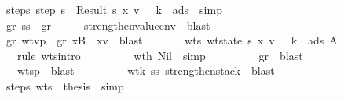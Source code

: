 \begin{isabellebody}
\ \ \ \ \ \ \isamarkupfalse \ steps{\isacharcolon}\ {\isachardoublequoteopen}step\ s\ {\isacharequal}\ Result\ {\isacharparenleft}s{\isacharprime}{\isacharcomma}\ {\isacharparenleft}x{\isacharcomma}\ v{\isacharprime}{\isacharparenright}\ {\isacharhash}\ {\isasymrho}{\isacharcomma}\ k{\isacharcomma}\ {\isasymmu}{\isacharprime}{\isacharcomma}\ ads{}{\isacharparenright}{\isachardoublequoteclose}\ \isamarkupfalse \ simp\isanewline
\ \ \ \ \ \ \isamarkupfalse \ gr\ ss\ \isamarkupfalse \ gr{}{\isacharcolon}\ {\isachardoublequoteopen}{\isasymGamma}{\isacharsemicolon}\ {\isasymSigma}{\isacharprime}\ {\isasymturnstile}\ {\isasymrho}{\isachardoublequoteclose}\ \isamarkupfalse \ strengthen{\isacharunderscore}value{\isacharunderscore}env\ \isamarkupfalse \ blast\isanewline
\ \ \ \ \ \ \isamarkupfalse \ gr{}\ wtvp\ \isamarkupfalse \ gr{}{\isacharcolon}\ {\isachardoublequoteopen}{\isacharparenleft}x{\isacharcomma}B{\isacharparenright}{\isacharhash}{\isasymGamma}{\isacharsemicolon}{\isasymSigma}{\isacharprime}\ {\isasymturnstile}\ {\isacharparenleft}x{\isacharcomma}v{\isacharprime}{\isacharparenright}{\isacharhash}{\isasymrho}{\isachardoublequoteclose}\ \isamarkupfalse \ blast\isanewline
\ \ \ \ \ \ \isamarkupfalse \ wt{\isacharunderscore}s{\isacharcolon}\ {\isachardoublequoteopen}wt{\isacharunderscore}state\ {\isacharparenleft}s{\isacharprime}{\isacharcomma}\ {\isacharparenleft}x{\isacharcomma}\ v{\isacharprime}{\isacharparenright}\ {\isacharhash}\ {\isasymrho}{\isacharcomma}\ k{\isacharcomma}\ {\isasymmu}{\isacharprime}{\isacharcomma}\ ads{}{\isacharparenright}\ A{\isachardoublequoteclose}\ \isanewline
\ \ \ \ \ \ \ \ \isamarkupfalse \ {\isacharparenleft}rule\ wts{\isacharunderscore}intro{\isacharparenright}\isanewline
\ \ \ \ \ \ \ \ \isamarkupfalse \ wth{}\ Nil\ \isamarkupfalse \ simp\isanewline
\ \ \ \ \ \ \ \ \isamarkupfalse \ gr{}\ \isamarkupfalse \ blast\isanewline
\ \ \ \ \ \ \ \ \isamarkupfalse \ wtsp\ \isamarkupfalse \ blast\isanewline
\ \ \ \ \ \ \ \ \isamarkupfalse \ wt{\isacharunderscore}k\ ss\ strengthen{\isacharunderscore}stack\ \isamarkupfalse \ blast\ \isamarkupfalse \isanewline
\ \ \ \ \ \ \isamarkupfalse \ steps\ wt{\isacharunderscore}s\ \isamarkupfalse \ {\isacharquery}thesis\ \isamarkupfalse \ simp\isanewline

\end{isabellebody}
